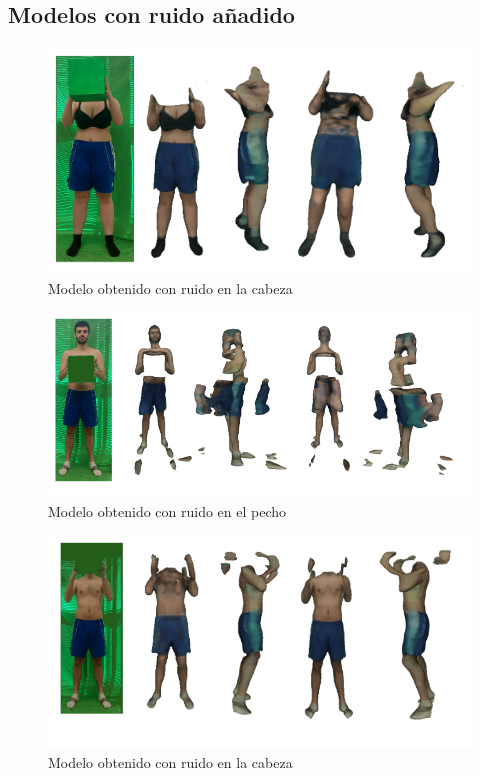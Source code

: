\subsection{Modelos con ruido añadido}

\begin{figure}[H]
	\centering
	\includegraphics[scale=0.65]{imagenes/cameliae.png}
	\caption{Modelo obtenido con ruido en la cabeza}
	\label{fig:figura20}
\end{figure}

\begin{figure}[H]
	\centering
	\includegraphics[scale=0.65]{imagenes/nahuele1.png}
	\caption{Modelo obtenido con ruido en el pecho}
	\label{fig:figura21}
\end{figure}

\begin{figure}[H]
	\centering
	\includegraphics[scale=0.65]{imagenes/nahuele2.png}
	\caption{Modelo obtenido con ruido en la cabeza}
	\label{fig:figura22}
\end{figure}

